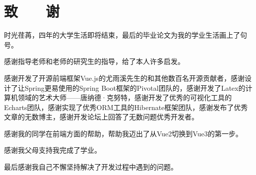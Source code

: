 
\chapter*{\hfill 致　　谢 \hfill}
\linespread{1.25}

时光荏苒，四年的大学生活即将结束，最后的毕业论文为我的学业生活画上了句号。

感谢指导老师和老师的研究生的指导，给了本人许多启发。

感谢开发了开源前端框架Vue.js的尤雨溪先生的和其他数百名开源贡献者，感谢设计了让Spring更易使用的Spring Boot框架的Pivotal团队的，感谢开发了Latex的计算机领域的艺术大师——唐纳德·克努特，感谢开发了优秀的可视化工具的Echarts团队，感谢实现了优秀ORM工具的Hibernate框架团队，感谢发布了优秀文章的无数博主，感谢开发论坛上回答了无数问题优秀开发者。

感谢我的同学在前端方面的帮助，帮助我迈出了从Vue2切换到Vue3的第一步。

感谢我父母支持我完成了学业。

最后感谢我自己不懈坚持解决了开发过程中遇到的问题。
